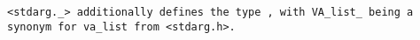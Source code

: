 \tt{<stdarg._>} additionally defines the type , with
\tt{VA_list_} being a synonym for \tt{va_list} from \tt{<stdarg.h>}.
